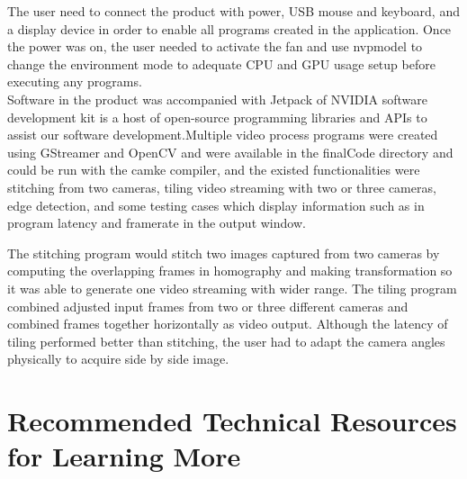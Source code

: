 \documentclass[letterpaper,10pt,serif,draftclsnofoot,onecolumn,compsoc,titlepage]{IEEEtran}
\begin{document}
The user need to connect the product with power, USB mouse and keyboard, and a display device in 
order to enable all programs created in the application. Once the power was on, the user needed 
to activate the fan and use nvpmodel to change the environment mode to adequate CPU and GPU usage 
setup before executing any programs. \\

Software in the product was accompanied with Jetpack of NVIDIA software development kit is a host 
of open-source programming libraries and APIs to assist our software development.Multiple video 
process programs were created using GStreamer and OpenCV and were available in the finalCode 
directory and could be run with the camke compiler, and the existed functionalities were stitching 
from two cameras, tiling video streaming with two or three cameras, edge detection, and some 
testing cases which display information such as in program latency and framerate in the output 
window. \\

\newpage

The stitching program would stitch two images captured from two cameras by computing the overlapping 
frames in homography and making transformation so it was able to generate one video streaming with 
wider range. The tiling program combined adjusted input frames from two or three different cameras 
and combined frames together horizontally as video output. Although the latency of tiling performed 
better than stitching, the user had to adapt the camera angles physically to acquire side by side 
image. \\

\newpage

\section{Recommended Technical Resources for Learning More}
\end{document}
